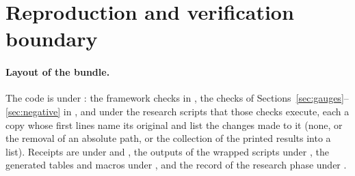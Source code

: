 \ifdefined\VthreeExactPassed\else\fi
\section{Reproduction and verification boundary}\label{app:reproduce}
\paragraph{Layout of the bundle.}
The code is under : the framework checks in , the checks of Sections~\ref{sec:gauges}--\ref{sec:negative} in , and under  the research scripts that those checks execute, each a copy whose first lines name its original and list the changes made to it (none, or the removal of an absolute path, or the collection of the printed results into a list). Receipts are under  and , the outputs of the wrapped scripts under , the generated tables and macros under , and the record of the research phase under .

